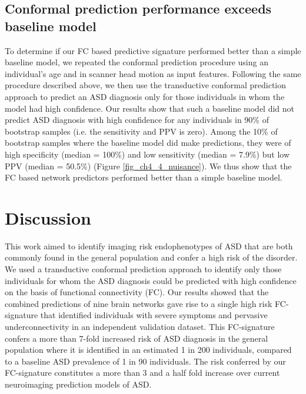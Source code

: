 \documentclass[9pt,lineno]{elife}
\begin{document}
\subsection{Conformal prediction performance exceeds baseline model}
To determine if our FC based predictive signature performed better than a simple baseline model, we repeated the conformal prediction procedure using an individual's age and in scanner head motion as input features. Following the same procedure described above, we then use the transductive conformal prediction approach to predict an ASD diagnosis only for those individuals in whom the model had high confidence. Our results show that such a baseline model did not predict ASD diagnosis with high confidence for any individuals in 90\% of bootstrap samples (i.e. the sensitivity and PPV is zero). Among the 10\% of bootstrap samples where the baseline model did make predictions, they were of high specificity (median = 100\%) and low sensitivity (median = 7.9\%) but low PPV (median = 50.5\%) (Figure \ref{fig_ch4_4_nuisance}). We thus show that the FC based network predictors performed better than a simple baseline model.

\section{Discussion}
This work aimed to identify imaging risk endophenotypes of ASD that are both commonly found in the general population and confer a high risk of the disorder. We used a transductive conformal prediction approach to identify only those individuals for whom the ASD diagnosis could be predicted with high confidence on the basis of functional connectivity (FC). Our results showed that the combined predictions of nine brain networks gave rise to a single high risk FC-signature that identified individuals with severe symptoms and pervasive underconnectivity in an independent validation dataset. This FC-signature confers a more than 7-fold increased risk of ASD diagnosis in the general population where it is identified in an estimated 1 in 200 individuals, compared to a baseline ASD prevalence of 1 in 90 individuals. The risk conferred by our FC-signature constitutes a more than 3 and a half fold increase over current neuroimaging prediction models of ASD.  
\end{document}
